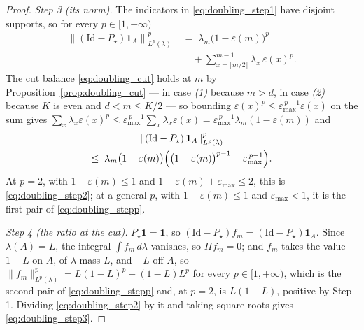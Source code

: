 \begin{proof}
\emph{Step 3 (its norm).} The indicators in \eqref{eq:doubling_step1} have disjoint supports,
so for every $p\in[1,+\infty)$
\begin{equation}
\begin{aligned}
    \left\|\left(\mathrm{Id}-P_\star\right)\mathbf 1_A\right\|^p_{L^p(\lambda)}
    \;&=\;\lambda_m\bigl(1-\varepsilon(m)\bigr)^p\\
    &\quad+\sum_{x=\lceil m/2\rceil}^{m-1}\lambda_x\,\varepsilon(x)^p .
\end{aligned}
\end{equation}
The cut balance \eqref{eq:doubling_cut} holds at $m$ by Proposition~\ref{prop:doubling_cut} ---
in case \emph{(1)} because $m>d$, in case \emph{(2)} because $K$ is even and $d<m\leq K/2$ ---
so bounding $\varepsilon(x)^p\leq\varepsilon_{\max}^{\,p-1}\varepsilon(x)$ on the sum gives
$\sum_x\lambda_x\varepsilon(x)^p\leq\varepsilon_{\max}^{\,p-1}\sum_x\lambda_x\varepsilon(x)=\varepsilon_{\max}^{\,p-1}\lambda_m(1-\varepsilon(m))$
and
\begin{equation}
\begin{gathered}
    \left\|\left(\mathrm{Id}-P_\star\right)\mathbf 1_A\right\|^p_{L^p(\lambda)}\\
    \leq\;\lambda_m\bigl(1-\varepsilon(m)\bigr)
    \Bigl(\bigl(1-\varepsilon(m)\bigr)^{p-1}+\varepsilon_{\max}^{\,p-1}\Bigr).
\end{gathered}
\end{equation}
At $p=2$, with $1-\varepsilon(m)\leq1$ and $1-\varepsilon(m)+\varepsilon_{\max}\leq2$, this is
\eqref{eq:doubling_step2}; at a general $p$, with $1-\varepsilon(m)\leq1$ and
$\varepsilon_{\max}<1$, it is the first pair of \eqref{eq:doubling_stepp}.

\emph{Step 4 (the ratio at the cut).} $P_\star\mathbf 1=\mathbf 1$, so
$(\mathrm{Id}-P_\star)f_m=(\mathrm{Id}-P_\star)\mathbf 1_A$. Since $\lambda(A)=L$, the integral
$\int f_m\,d\lambda$ vanishes, so $\Pi f_m=0$; and $f_m$ takes the value $1-L$ on $A$, of
$\lambda$-mass $L$, and $-L$ off $A$, so
$\|f_m\|^p_{L^p(\lambda)}=L(1-L)^p+(1-L)L^p$ for every $p\in[1,+\infty)$, which is the second
pair of \eqref{eq:doubling_stepp} and, at $p=2$, is $L(1-L)$, positive by Step 1.
Dividing \eqref{eq:doubling_step2} by it and taking square roots gives
\eqref{eq:doubling_step3}.
\end{proof}

